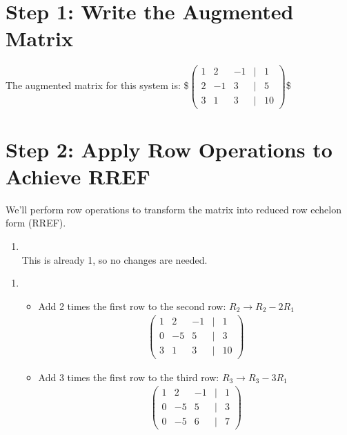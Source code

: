 \documentclass[letterpaper,10pt,english]{jupyterBook}
\begin{document}
\section{Step 1: Write the Augmented Matrix}
\label{\detokenize{lessons/Gaussian_Elimination-student:step-1-write-the-augmented-matrix}}
\sphinxAtStartPar
The augmented matrix for this system is:
\$\(
\begin{pmatrix}
1 & 2 & -1 & \vert & 1 \\
2 & -1 & 3 & \vert & 5 \\
3 & 1 & 3 & \vert & 10
\end{pmatrix}
\)\$


\section{Step 2: Apply Row Operations to Achieve RREF}
\label{\detokenize{lessons/Gaussian_Elimination-student:step-2-apply-row-operations-to-achieve-rref}}
\sphinxAtStartPar
We’ll perform row operations to transform the matrix into reduced row echelon form (RREF).
\begin{enumerate}
%
\item {} 
\sphinxAtStartPar
{}\\
This is already 1, so no changes are needed.

\end{enumerate}
\begin{enumerate}
%
\setcounter{enumi}{1}
\item {} 
\sphinxAtStartPar
{}
\begin{itemize}
\item {} 
\sphinxAtStartPar
Add \sphinxhyphen{}2 times the first row to the second row:
\(R_2 \rightarrow R_2 - 2R_1\)
\begin{equation*}
\begin{split}
     \begin{pmatrix}
     1 & 2 & -1 & \vert & 1 \\
     0 & -5 & 5 & \vert & 3 \\
     3 & 1 & 3 & \vert & 10
     \end{pmatrix}
     \end{split}
\end{equation*}
\item {} 
\sphinxAtStartPar
Add \sphinxhyphen{}3 times the first row to the third row:
\(R_3 \rightarrow R_3 - 3R_1\)
\begin{equation*}
\begin{split}
     \begin{pmatrix}
     1 & 2 & -1 & \vert & 1 \\
     0 & -5 & 5 & \vert & 3 \\
     0 & -5 & 6 & \vert & 7
     \end{pmatrix}
     \end{split}
\end{equation*}
\end{itemize}

\end{enumerate}
\end{document}

